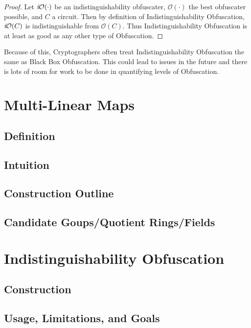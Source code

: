 \documentclass[12pt,twoside]{reedthesis}
\begin{document}
    \newcommand{\Oh}[0]{\mathcal{O}}
    \begin{proof}
    Let $\textit{i}\mathcal{O}(\cdot)$ be an indistinguishability obfuscater, $\Oh(\cdot)$ the best obfuscater possible, and $C$ a circuit. Then by definition of Indistinguishability Obfuscation, $\textit{i}\mathcal{O}(C)$ is indistinguishable from $\Oh(C)$. Thus Indistinguishability Obfuscation is at least as good as any other type of Obfuscation.
    \end{proof}
    
    Because of this, Cryptographers often treat Indistinguishability Obfuscation the same as Black Box Obfuscation. This could lead to issues in the future and there is lots of room for work to be done in quantifying levels of Obfuscation.
    
    
    
    
    \chapter{Multi-Linear Maps}
    \section{Definition}
    
    \section{Intuition}
    \section{Construction Outline}
    \section{Candidate Goups/Quotient Rings/Fields}
    
    
    
    \chapter{Indistinguishability Obfuscation}
    \section{Construction}
    \section{Usage, Limitations, and Goals}
    
\end{document}
